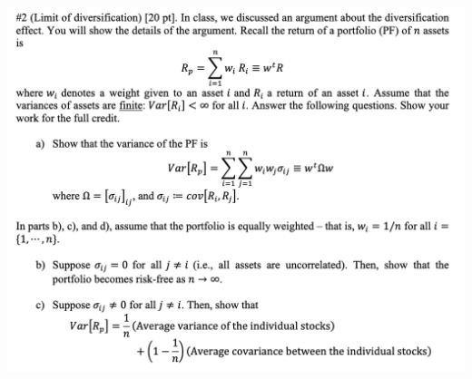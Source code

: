 \documentclass[12pt]{scrartcl}
\begin{document}
\newpage

\includegraphics[width=15cm]{2.png}
\end{document}
